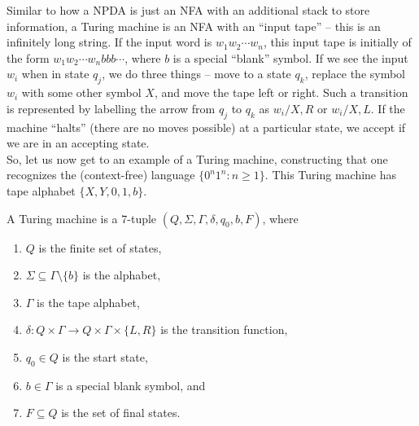Similar to how a NPDA is just an NFA with an additional stack to store information, a Turing machine is an NFA with an ``input tape'' -- this is an infinitely long string. If the input word is $w_1w_2 \cdots w_n$, this input tape is initially of the form $w_1 w_2 \cdots w_n b b b \cdots$, where $b$ is a special ``blank'' symbol. If we see the input $w_i$ when in state $q_j$, we do three things -- move to a state $q_k$, replace the symbol $w_i$ with some other symbol $X$, and move the tape left or right. Such a transition is represented by labelling the arrow from $q_j$ to $q_k$ as $w_i / X, R$ or $w_i / X, L$. If the machine ``halts'' (there are no moves possible) at a particular state, we accept if we are in an accepting state.\\
So, let us now get to an example of a Turing machine, constructing that one recognizes the (context-free) language $\{ 0^n 1^n : n \ge 1 \}$. This Turing machine has tape alphabet $\{X,Y,0,1,b\}$.

\begin{center}
\end{center}

\begin{fdef}
	A Turing machine is a $7$-tuple $(Q,\Sigma,\Gamma,\delta,q_0,b,F)$, where
	\begin{enumerate}
		\item $Q$ is the finite set of states,
		\item $\Sigma \subseteq \Gamma \setminus \{b\}$ is the alphabet,
		\item $\Gamma$ is the tape alphabet,
		\item $\delta : Q \times \Gamma \to Q \times \Gamma \times \{L,R\}$ is the transition function,
		\item $q_0 \in Q$ is the start state,
		\item $b \in \Gamma$ is a special blank symbol, and
		\item $F \subseteq Q$ is the set of final states.
	\end{enumerate}
\end{fdef}